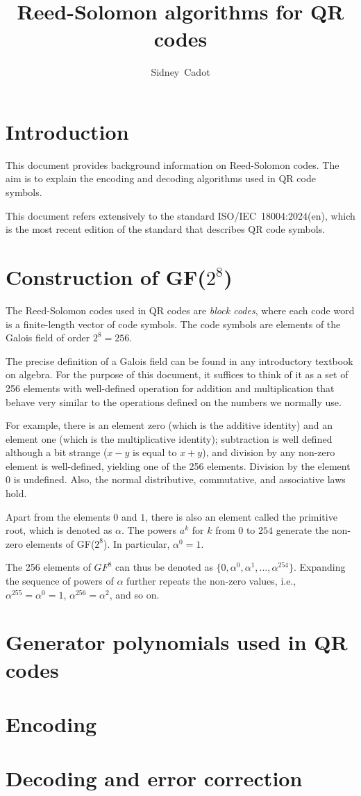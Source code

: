 \documentclass[a4paper]{article}
\title{Reed-Solomon algorithms for QR codes}
\author{Sidney~Cadot}
\begin{document}
\maketitle
\section{Introduction}
%
This document provides background information on Reed-Solomon codes.
The aim is to explain the encoding and decoding algorithms used in QR code symbols.

This document refers extensively to the standard ISO/IEC~18004:2024(en), which is the
most recent edition of the standard that describes QR code symbols.
%
\section{Construction of GF($2^8$)}
The Reed-Solomon codes used in QR codes are \emph{block codes}, where each code word is a
finite-length vector of code symbols. The code symbols are elements of the Galois field of
order $2^8=256$.

The precise definition of a Galois field can be found in any introductory textbook
on algebra. For the purpose of this document, it suffices to think of it as a set of
256 elements with well-defined operation for addition and multiplication that behave
very similar to the operations defined on the numbers we normally use.

For example, there is an element zero (which is the additive identity) and an element
one (which is the multiplicative identity); subtraction is well defined although a bit
strange ($x-y$ is equal to $x+y$), and division by any non-zero element is well-defined,
yielding one of the 256 elements. Division by the element 0 is undefined.
Also, the normal distributive, commutative, and associative laws hold.

Apart from the elements $0$ and $1$, there is also an element called the primitive root,
which is denoted as $\alpha$. The powers $a^k$ for $k$ from $0$ to $254$ generate the
non-zero elements of GF($2^8$). In particular, $\alpha^0=1$.

The 256 elements of $GF^8$ can thus be denoted as $\{ 0, \alpha^0, \alpha^1, \ldots, \alpha^{254} \}$.
Expanding the sequence of powers of $\alpha$ further repeats the non-zero values, i.e., $\alpha^{255}=\alpha^0=1$, $\alpha^{256}=\alpha^2$, and so on.

\section{Generator polynomials used in QR codes}
\section{Encoding}
\section{Decoding and error correction}
\end{document}
